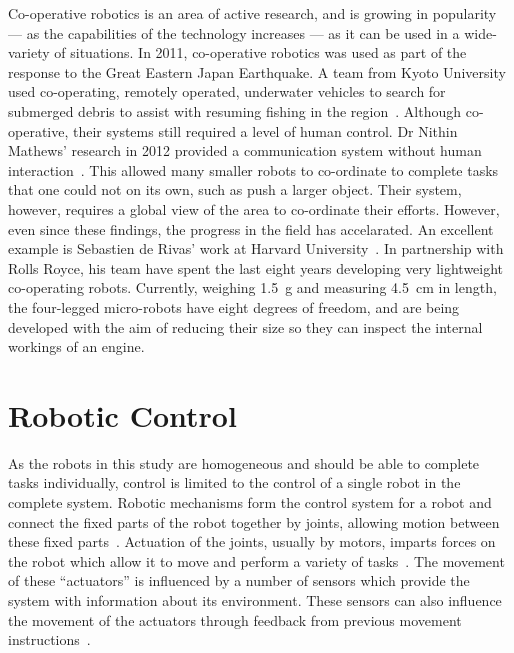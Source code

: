 Co-operative robotics is an area of active research, and is growing in popularity --- as the
capabilities of the technology increases --- as it can be used in a wide-variety of
situations. In 2011, co-operative robotics was used as part of the
response to the Great Eastern Japan Earthquake. A team from Kyoto University
used co-operating, remotely operated, underwater vehicles to search for submerged
debris to assist with resuming fishing in the region~\cite{matsuno2014utilization}.
Although co-operative, their systems still required a level of human control.
Dr Nithin Mathews' research in 2012 provided a communication system without
human interaction~\cite{mathews2012spatially}. This allowed many smaller robots
to co-ordinate to complete tasks that one could not on its own, such as push a
larger object. Their system, however, requires a global view of the area to 
co-ordinate their efforts. However, even since these findings, the progress
in the field has accelarated. An excellent example is Sebastien de Rivas' work at
Harvard University~\cite{rollsroyceSWARM}. In partnership with Rolls Royce, his
team have spent the last eight years developing very lightweight co-operating robots.
Currently, weighing \SI{1.5}{\g} and measuring \SI{4.5}{\cm} in length, the
four-legged micro-robots have eight degrees of freedom, and are being developed with
the aim of reducing their size so they can inspect the internal workings of an engine.

\section{Robotic Control} \label{litreview/robotics/control}  
As the robots in this study are homogeneous and should be able to complete 
tasks individually, control is limited to the control of a single robot in the 
complete system. Robotic mechanisms form the control system for a robot and 
connect the fixed parts of the robot together by joints, allowing motion between 
these fixed parts~\cite{lynch2017modern}. Actuation of the joints, usually 
by motors, imparts forces on the robot which allow it to move and perform a 
variety of tasks~\cite{lynch2017modern}. The movement of these ``actuators'' 
is influenced by a number of sensors which provide the system with information 
about its environment. These sensors can also influence the movement of the 
actuators through feedback from previous movement instructions~\cite{lynch2017modern}.    

